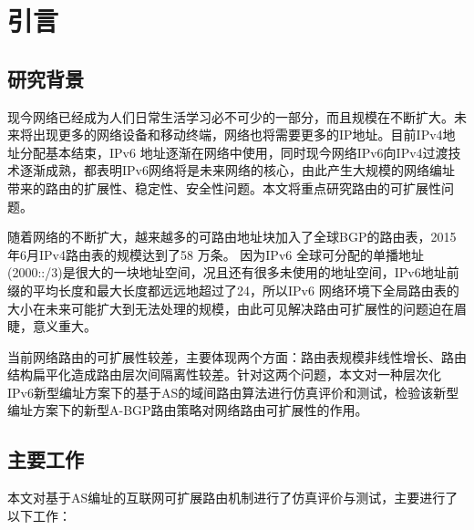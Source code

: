 

\chapter{引言}
\label{cha:intro}

\section{研究背景}
现今网络已经成为人们日常生活学习必不可少的一部分，而且规模在不断扩大。未来将出现更多的网络设备和移动终端，网络也将需要更多的IP地址。目前IPv4地址分配基本结束，IPv6 地址逐渐在网络中使用，同时现今网络IPv6向IPv4过渡技术逐渐成熟，都表明IPv6网络将是未来网络的核心，由此产生大规模的网络编址带来的路由的扩展性、稳定性、安全性问题。本文将重点研究路由的可扩展性问题。

随着网络的不断扩大，越来越多的可路由地址块加入了全球BGP的路由表，2015年6月IPv4路由表的规模达到了58 万条\cite{bgptabledata}。 因为IPv6 全球可分配的单播地址(2000::/3)是很大的一块地址空间，况且还有很多未使用的地址空间，IPv6地址前缀的平均长度和最大长度都远远地超过了24，所以IPv6 网络环境下全局路由表的大小在未来可能扩大到无法处理的规模，由此可见解决路由可扩展性的问题迫在眉睫，意义重大。

当前网络路由的可扩展性较差，主要体现两个方面：路由表规模非线性增长、路由结构扁平化造成路由层次间隔离性较差。针对这两个问题，本文对一种层次化IPv6新型编址方案下的基于AS的域间路由算法进行仿真评价和测试，检验该新型编址方案下的新型A-BGP路由策略对网络路由可扩展性的作用。


\section{主要工作}
本文对基于AS编址的互联网可扩展路由机制进行了仿真评价与测试，主要进行了以下工作：

